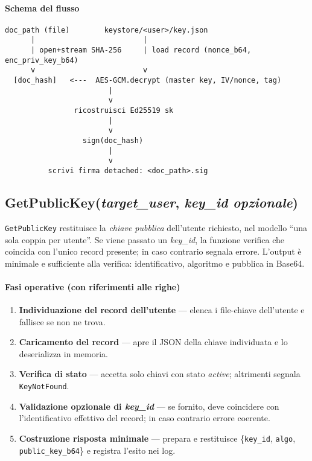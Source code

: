 \newpage
\paragraph{Schema del flusso}

\begin{verbatim}
doc_path (file)        keystore/<user>/key.json
      |                         |
      | open+stream SHA-256     | load record (nonce_b64, enc_priv_key_b64)
      v                         v
  [doc_hash]   <---  AES-GCM.decrypt (master key, IV/nonce, tag)
                        |
                        v
                ricostruisci Ed25519 sk
                        |
                        v
                  sign(doc_hash)
                        |
                        v
          scrivi firma detached: <doc_path>.sig
\end{verbatim}

\clearpage
\subsection{GetPublicKey(\textit{target\_user}, \textit{key\_id opzionale})}

\texttt{GetPublicKey} restituisce la \emph{chiave pubblica} dell'utente richiesto, nel modello ``una sola coppia per utente''. Se viene passato un \textit{key\_id}, la funzione verifica che coincida con l'unico record presente; in caso contrario segnala errore. L'output è minimale e sufficiente alla verifica: identificativo, algoritmo e pubblica in Base64.

\paragraph{Fasi operative (con riferimenti alle righe)}
\begin{enumerate}
  \item \textbf{Individuazione del record dell'utente} — elenca i file-chiave dell'utente e fallisce se non ne trova.
  \item \textbf{Caricamento del record} — apre il JSON della chiave individuata e lo deserializza in memoria.
  \item \textbf{Verifica di stato} — accetta solo chiavi con stato \textit{active}; altrimenti segnala \texttt{KeyNotFound}.
  \item \textbf{Validazione opzionale di \textit{key\_id}} — se fornito, deve coincidere con l'identificativo effettivo del record; in caso contrario errore coerente.
  \item \textbf{Costruzione risposta minimale} — prepara e restituisce \{\texttt{key\_id}, \texttt{algo}, \texttt{public\_key\_b64}\} e registra l'esito nei log.
\end{enumerate}

